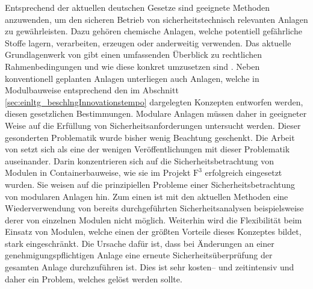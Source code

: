 Entsprechend der aktuellen deutschen Gesetze sind geeignete Methoden anzuwenden, um den sicheren Betrieb von sicherheitstechnisch relevanten Anlagen zu gew\"ahrleisten. Dazu geh\"oren chemische Anlagen, welche potentiell gef\"ahrliche Stoffe lagern, verarbeiten, erzeugen oder anderweitig verwenden. Das aktuelle Grundlagenwerk  von \citeauthor{Hauptmanns_2013} gibt einen umfassenden \"Uberblick zu rechtlichen Rahmenbedingungen und wie diese konkret umzusetzen sind \cite{Hauptmanns_2013}. \newline
Neben konventionell geplanten Anlagen unterliegen auch Anlagen, welche in Modulbauweise entsprechend den im Abschnitt \ref{sec:einltg_beschlngInnovationstempo} dargelegten Konzepten entworfen werden, diesen gesetzlichen Bestimmungen. Modulare Anlagen m\"ussen daher in geeigneter Weise auf die Erf\"ullung von Sicherheitsanforderungen untersucht werden. Dieser gesonderten Problematik wurde bisher wenig Beachtung geschenkt. Die Arbeit von \citeauthor{Fleischer_2015} \cite{Fleischer_2015} setzt sich als eine der wenigen Ver\"offentlichungen mit dieser Problematik auseinander. Darin konzentrieren sich \citeauthor{Fleischer_2015} auf die Sicherheitsbetrachtung von Modulen in Containerbauweise, wie sie im Projekt $\text{F}^{3}$ erfolgreich eingesetzt wurden. Sie weisen auf die prinzipiellen Probleme einer Sicherheitsbetrachtung von modularen Anlagen hin. Zum einen ist mit den aktuellen Methoden eine Wiederverwendung von bereits durchgef\"uhrten Sicherheitsanalysen beispielsweise derer von einzelnen Modulen nicht m\"oglich. Weiterhin wird die Flexibilit\"at beim Einsatz von Modulen, welche einen der gr\"o\ss{}ten Vorteile dieses Konzeptes bildet, stark eingeschr\"ankt. Die Ursache daf\"ur ist, dass bei \"Anderungen an einer genehmigungspflichtigen Anlage eine erneute Sicherheits\"uberpr\"ufung der gesamten Anlage durchzuf\"uhren ist. Dies ist sehr kosten-- und zeitintensiv und daher ein Problem, welches gel\"ost werden sollte. \newline
